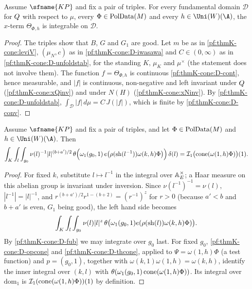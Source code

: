 \begin{lemma}\label{pf:thmK-cone:xint}
Assume $\sfname{KP}$ and fix a pair of triples.  For every fundamental domain $\mathcal D$ for $Q$ with respect
to $\mu$, every $\Phi\in\operatorname{PolData}(M)$ and every $h\in\Uni(W)(\A)$, the $x$-term $\Theta_{\Phi,h}$ is integrable on
$\mathcal D$.
\end{lemma}

\begin{proof}
The triples show that $B$, $G$ and $G_1$ are good.  Let $m$ be as in \cref{pf:thmK-cone:leviV}, $(\mu_N,c)$ as in
\ref{pf:thmK-cone:D-iwasawa} and $C\in(0,\infty)$ as in \ref{pf:thmK-cone:D-unfoldstab}, for the standing $K$, $\mu_K$
and $\mu^\times$ (the statement does not involve them).  The function $f=\Theta_{\Phi,h}$ is continuous
\ref{pf:thmK-cone:D-cont}, hence measurable, and $|f|$ is continuous, non-negative and left invariant under
$Q$ (\cref{pf:thmK-cone:xQinv}) and under $N(H)$ (\cref{pf:thmK-cone:xNinv}).  By
\ref{pf:thmK-cone:D-unfoldstab}, $\int_{\mathcal D}|f|\,d\mu=C\,J(|f|)$, which is finite by \ref{pf:thmK-cone:D-conv}.
\end{proof}

\begin{lemma}\label{pf:thmK-cone:itcone}
Assume $\sfname{KP}$ and fix a pair of triples, and let $\Phi\in\operatorname{PolData}(M)$ and $h\in\Uni(W)(\A)$.  Then
\[
  \int_K\int_l\int_{g_0}\nu(l)^{-1}|l|^{(b+a')/2}\,
  \theta\Bigl(\omega_1(g_0,1)\,e\bigl(\rho(\operatorname{sh}(l^{-1}))\omega(k,h)\Phi\bigr)\Bigr)\,\delta(l)
  =\mathcal{I}_1\bigl(\operatorname{cone}(\omega(1,h)\Phi)\bigr)(1).
\]
\end{lemma}

\begin{proof}
For fixed $k$, substitute $l\mapsto l^{-1}$ in the integral over $\mathbb{A}_E^\times$; a Haar measure on this abelian group
is invariant under inversion.  Since $\nu(l^{-1})^{-1}=\nu(l)$, $|l^{-1}|=|l|^{-1}$, and
$r^{(b+a')/2}r^{1-(b+2)}=(r^{-1})^z$ for $r>0$ (because $a'<b$ and $b+a'$ is even, $G_1$ being good), the left hand side
becomes
\[
  \int_K\int_l\int_{g_0}\nu(l)|l|^z\,\theta\bigl(\omega_1(g_0,1)e(\rho(\operatorname{sh}(l))\omega(k,h)\Phi)\bigr).
\]
By \ref{pf:thmK-cone:D-fub} we may integrate over $g_0$ last.  For fixed $g_0$, \ref{pf:thmK-cone:D-opcone} and
\ref{pf:thmK-cone:D-thcone}, applied to $\Psi=\omega(1,h)\Phi$ (a test function) and $p=(g_0,1)$, together with
$\omega(k,1)\omega(1,h)=\omega(k,h)$, identify the inner integral over $(k,l)$ with
$\theta(\omega_1(g_0,1)\operatorname{cone}(\omega(1,h)\Phi))$.  Its integral over $\mathrm{dom}_1$ is
$\mathcal{I}_1(\operatorname{cone}(\omega(1,h)\Phi))(1)$ by definition.
\end{proof}

